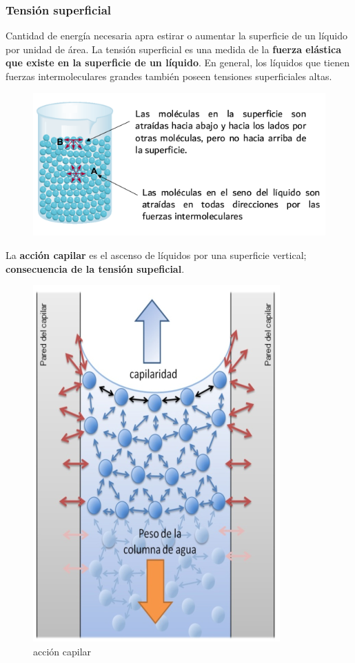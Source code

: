 \documentclass[]{article}
\begin{document}
\subsubsection{Tensión superficial}
Cantidad de energía necesaria apra estirar o aumentar la superficie de un líquido por unidad de área. La tensión superficial es una medida de la \textbf{fuerza elástica que existe en la superficie de un líquido}. En general, los líquidos que tienen fuerzas intermoleculares grandes también poseen tensiones superficiales altas.

\begin{figure}[H]
\center
\includegraphics[scale=0.45]{foto10.png}
\end{figure}

La \textbf{acción capilar} es el ascenso de líquidos por una superficie vertical; \textbf{consecuencia de la tensión supeficial}.

\begin{figure}[H]
\center
\includegraphics[scale=0.3]{foto11.png}
\caption{acción capilar}
\end{figure}
\end{document}
